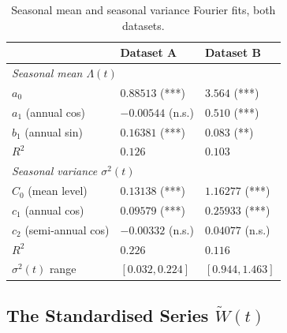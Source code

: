 \documentclass[11pt, a4paper, twoside]{article}
\begin{document}
\begin{table}[htbp]
\centering
\small
\caption{Seasonal mean and seasonal variance Fourier fits, both datasets.}
\label{tab:seasonal}
\begin{tabular}{l l l}
\toprule
& \textbf{Dataset A} & \textbf{Dataset B} \\
\midrule
\multicolumn{3}{l}{\textit{Seasonal mean $\Lambda(t)$}} \\
$a_0$ & $0.88513$ (***) & $3.564$ (***) \\
$a_1$ (annual cos) & $-0.00544$ (n.s.) & $0.510$ (***) \\
$b_1$ (annual sin) & $0.16381$ (***) & $0.083$ (**) \\
$R^2$ & $0.126$ & $0.103$ \\
\midrule
\multicolumn{3}{l}{\textit{Seasonal variance $\sigma^2(t)$}} \\
$C_0$ (mean level) & $0.13138$ (***) & $1.16277$ (***) \\
$c_1$ (annual cos) & $0.09579$ (***) & $0.25933$ (***) \\
$c_2$ (semi-annual cos) & $-0.00332$ (n.s.) & $0.04077$ (n.s.) \\
$R^2$ & $0.226$ & $0.116$ \\
$\sigma^2(t)$ range & $[0.032, 0.224]$ & $[0.944, 1.463]$ \\
\bottomrule
\end{tabular}
\end{table}

\subsection{The Standardised Series $\widetilde W(t)$}
\label{sec:phase1-wtilde}
\end{document}
